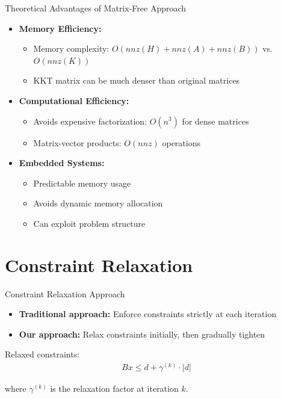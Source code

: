\documentclass{beamer}
\begin{document}
\begin{frame}{Theoretical Advantages of Matrix-Free Approach}
    \begin{itemize}
        \item \textbf{Memory Efficiency:} 
            \begin{itemize}
                \item Memory complexity: $O(nnz(H) + nnz(A) + nnz(B))$ vs. $O(nnz(K))$
                \item KKT matrix can be much denser than original matrices
            \end{itemize}
        \item \textbf{Computational Efficiency:}
            \begin{itemize}
                \item Avoids expensive factorization: $O(n^3)$ for dense matrices
                \item Matrix-vector products: $O(nnz)$ operations
            \end{itemize}
        \item \textbf{Embedded Systems:}
            \begin{itemize}
                \item Predictable memory usage
                \item Avoids dynamic memory allocation
                \item Can exploit problem structure
            \end{itemize}
    \end{itemize}
\end{frame}

\section{Constraint Relaxation}

\begin{frame}{Constraint Relaxation Approach}
    \begin{itemize}
        \item \textbf{Traditional approach:} Enforce constraints strictly at each iteration
        \item \textbf{Our approach:} Relax constraints initially, then gradually tighten
    \end{itemize}
    
    Relaxed constraints:
    \begin{align}
        Bx \leq d + \gamma^{(k)} \cdot |d|
    \end{align}
    
    where $\gamma^{(k)}$ is the relaxation factor at iteration $k$.
\end{frame}
\end{document}
